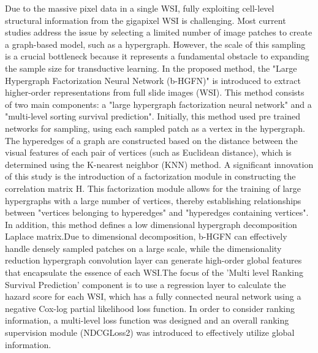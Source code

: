 \documentclass[journal,twoside,web]{ieeecolor}
\begin{document}
Due to the massive pixel data in a single WSI, fully exploiting cell-level structural information from the gigapixel WSI is challenging. Most current studies address the issue by selecting a limited number of image patches to create a graph-based model, such as a hypergraph. However, the scale of this sampling is a crucial bottleneck because it represents a fundamental obstacle to expanding the sample size for transductive learning.
In the proposed method, the "Large Hypergraph Factorization Neural Network (b-HGFN)" \cite{di2022big}is introduced to extract higher-order representations from full slide images (WSI). This method consists of two main components: a "large hypergraph factorization neural network" and a "multi-level sorting survival prediction". Initially, this method used pre trained networks for sampling, using each sampled patch as a vertex in the hypergraph. The hyperedges of a graph are constructed based on the distance between the visual features of each pair of vertices (such as Euclidean distance), which is determined using the K-nearest neighbor (KNN) method. A significant innovation of this study is the introduction of a factorization module in constructing the correlation matrix H. This factorization module allows for the training of large hypergraphs with a large number of vertices, thereby establishing relationships between "vertices belonging to hyperedges" and "hyperedges containing vertices". In addition, this method defines a low dimensional hypergraph decomposition Laplace matrix.Due to dimensional decomposition, b-HGFN can effectively handle densely sampled patches on a large scale, while the dimensionality reduction hypergraph convolution layer can generate high-order global features that encapsulate the essence of each WSI.The focus of the 'Multi level Ranking Survival Prediction' component is to use a regression layer to calculate the hazard score for each WSI, which has a fully connected neural network using a negative Cox-log partial likelihood loss function. In order to consider ranking information, a multi-level loss function was designed and an overall ranking supervision module (NDCGLoss2) was introduced to effectively utilize global information.
\end{document}
